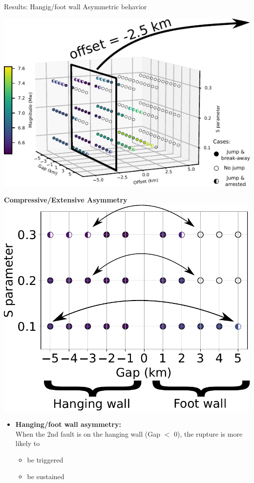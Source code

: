 \documentclass{beamer}
\begin{document}
\begin{frame}
 {Results: Hangig/foot wall Asymmetric behavior}
 
 \begin{minipage}{0.45\linewidth}
  \includegraphics[width=1\linewidth]{images/tests_shmax340_1plane2}
 \end{minipage} \pause
 \begin{minipage}{0.5\linewidth}
  \vskip -0.1cm
  \begin{center}
  \textbf{Compressive/Extensive Asymmetry}
  \vskip 0.2cm
  \includegraphics[width=0.9\linewidth]{images/tests_asym} \pause   
  \end{center}
  \vskip -0.3cm
  \begin{itemize}
   \item[\ding{43}] {\scriptsize \textbf{Hanging/foot wall asymmetry:} \\
                    When the 2nd fault is on the hanging wall 
                    (Gap $<$ 0), the rupture is more likely to }
                    \begin{itemize}
                     \item \scriptsize be triggered
                     \item \scriptsize be sustained
                    \end{itemize}
  \end{itemize}
 \end{minipage}
  

\end{frame}
\end{document}
